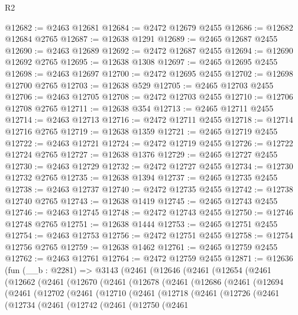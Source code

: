 \begin{lexlean}{R2}
\begin{coremodule}
@12682 := @2463 @12681
@12684 := @2472 @12679 @2455
@12686 := @12682 @12684 @2765
@12687 := @12638 @1291
@12689 := @2465 @12687 @2455
@12690 := @2463 @12689
@12692 := @2472 @12687 @2455
@12694 := @12690 @12692 @2765
@12695 := @12638 @1308
@12697 := @2465 @12695 @2455
@12698 := @2463 @12697
@12700 := @2472 @12695 @2455
@12702 := @12698 @12700 @2765
@12703 := @12638 @529
@12705 := @2465 @12703 @2455
@12706 := @2463 @12705
@12708 := @2472 @12703 @2455
@12710 := @12706 @12708 @2765
@12711 := @12638 @354
@12713 := @2465 @12711 @2455
@12714 := @2463 @12713
@12716 := @2472 @12711 @2455
@12718 := @12714 @12716 @2765
@12719 := @12638 @1359
@12721 := @2465 @12719 @2455
@12722 := @2463 @12721
@12724 := @2472 @12719 @2455
@12726 := @12722 @12724 @2765
@12727 := @12638 @1376
@12729 := @2465 @12727 @2455
@12730 := @2463 @12729
@12732 := @2472 @12727 @2455
@12734 := @12730 @12732 @2765
@12735 := @12638 @1394
@12737 := @2465 @12735 @2455
@12738 := @2463 @12737
@12740 := @2472 @12735 @2455
@12742 := @12738 @12740 @2765
@12743 := @12638 @1419
@12745 := @2465 @12743 @2455
@12746 := @2463 @12745
@12748 := @2472 @12743 @2455
@12750 := @12746 @12748 @2765
@12751 := @12638 @1444
@12753 := @2465 @12751 @2455
@12754 := @2463 @12753
@12756 := @2472 @12751 @2455
@12758 := @12754 @12756 @2765
@12759 := @12638 @1462
@12761 := @2465 @12759 @2455
@12762 := @2463 @12761
@12764 := @2472 @12759 @2455
@12871 := @12636
    (fun (__b : @2281) =>
    @3143
      (@2461
        (@12646
          (@2461
            (@12654
              (@2461
                (@12662
                  (@2461
                    (@12670
                      (@2461
                        (@12678
                          (@2461
                            (@12686
                              (@2461
                                (@12694
                                  (@2461
                                    (@12702
                                      (@2461
                                        (@12710
                                          (@2461
                                            (@12718
                                              (@2461
                                                (@12726
                                                  (@2461
                                                    (@12734
                                                      (@2461
                                                        (@12742
                                                          (@2461
                                                            (@12750
                                                              (@2461

\end{coremodule}
\end{lexlean}

